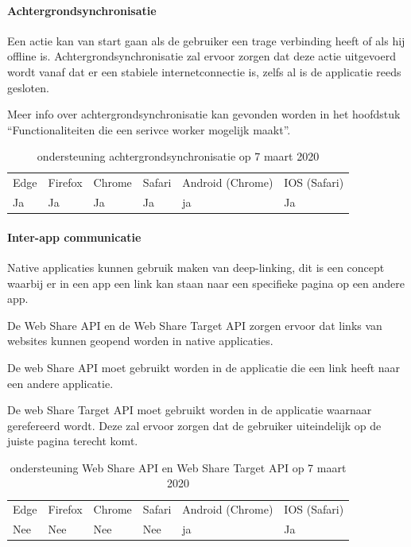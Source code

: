 \paragraph{Achtergrondsynchronisatie }

Een actie kan van start gaan als de gebruiker een trage verbinding heeft of als hij offline is. Achtergrondsynchronisatie zal ervoor zorgen dat deze actie uitgevoerd wordt vanaf dat er een stabiele internetconnectie is, zelfs al is de applicatie reeds gesloten.

Meer info over achtergrondsynchronisatie kan gevonden worden in het hoofdstuk “Functionaliteiten die een serivce worker mogelijk maakt”.


\begin{table}[H]
	\centering
	\begin{tabular}{llllll}
		Edge & Firefox & Chrome & Safari & Android (Chrome) & IOS (Safari) \\
		Ja   & Ja      &  Ja     & Ja     & ja               & Ja          
	\end{tabular}	
	\caption{ondersteuning achtergrondsynchronisatie op 7 maart 2020}
\end{table}


\paragraph{Inter-app communicatie}
Native applicaties kunnen gebruik maken van deep-linking, dit is een concept waarbij er in een app een link kan staan naar een specifieke pagina op een andere app.

De Web Share API \autocite{Giuca2019} en de Web Share Target API \autocite{Williger2019} zorgen ervoor dat links van websites kunnen geopend worden in native applicaties. 

De web Share API moet gebruikt worden in de applicatie die een link heeft naar een andere applicatie.

De web Share Target API moet gebruikt worden in de applicatie waarnaar gerefereerd wordt. Deze zal ervoor zorgen dat de gebruiker uiteindelijk op de juiste pagina terecht komt.

\begin{table}[H]
	\centering
	\begin{tabular}{llllll}
		Edge & Firefox & Chrome & Safari & Android (Chrome) & IOS (Safari) \\
		Nee   & Nee      &  Nee     & Nee     & ja               & Ja          
	\end{tabular}	
	\caption{ondersteuning Web Share API en Web Share Target API op 7 maart 2020}
\end{table}



